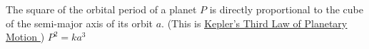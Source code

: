 {The square of the orbital period of a planet $P$ is directly proportional to the cube of the semi-major axis of its orbit $a$. (This is \href{http://en.wikipedia.org/wiki/Kepler}{\underline{Kepler's Third Law of Planetary Motion }}) }
{$P^2 = k a^3$}